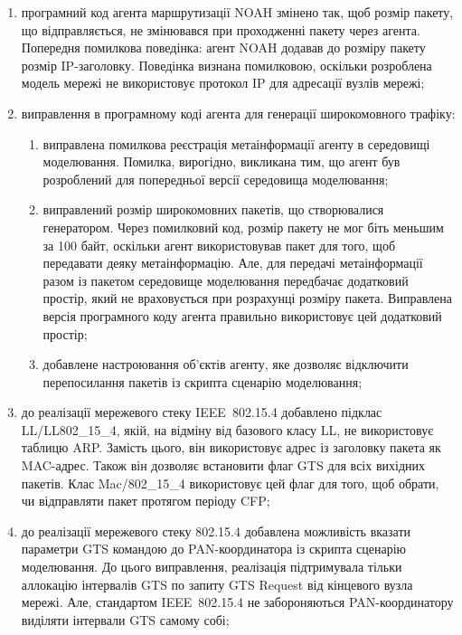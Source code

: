 \documentclass[a4paper,ukrainian,utf8,nocolumnsxix,floatsection,equationsection]{eskdtext}
\newcommand{\iee}[0]{IEEE~802.15.4\xspace}
\begin{document}
\begin{enumerate}

	\item програмний код агента маршрутизації NOAH змінено так, щоб розмір пакету, що відправляється, не змінювався при проходженні пакету через агента. Попередня помилкова поведінка: агент NOAH додавав до розміру пакету розмір IP-заголовку. Поведінка визнана помилковою, оскільки розроблена модель мережі не використовує протокол IP для адресації вузлів мережі; 

	\item виправлення в програмному коді агента для генерації широкомовного трафіку:
	\begin{enumerate}
		\item виправлена помилкова реєстрація метаінформації агенту в середовищі моделювання. Помилка, вирогідно, викликана тим, що агент був розроблений для попередньої версії середовища моделювання;
		
		\item виправлений розмір широкомовних пакетів, що створювалися генератором. Через помилковий код, розмір пакету не мог біть меньшим за 100 байт, оскільки агент використовував пакет для того, щоб передавати деяку метаінформацію. Але, для передачі метаінформації разом із пакетом середовище моделювання передбачає додатковий простір, який не враховується при розрахунці розміру пакета. Виправлена версія програмного коду агента правильно використовує цей додатковий простір;
		
		\item добавлене настроювання об’єктів агенту, яке дозволяє відключити перепосилання пакетів із скрипта сценарію моделювання;
	\end{enumerate}

	\item до реалізації мережевого стеку \iee добавлено підклас LL/LL802\_15\_4, якій, на відміну від базового класу LL, не використовує таблицю ARP. Замість цього, він використовує адрес із заголовку пакета як MAC-адрес. Також він дозволяє встановити флаг GTS для всіх вихідних пакетів. Клас Mac/802\_15\_4 використовує цей флаг для того, щоб обрати, чи відправляти пакет протягом періоду CFP; 

	\item до реалізації мережевого стеку 802.15.4 добавлена можливість вказати параметри GTS командою до PAN-координатора із скрипта сценарію моделювання. До цього виправлення, реалізація підтримувала тільки аллокацію інтервалів GTS по запиту GTS Request від кінцевого вузла мережі. Але, стандартом \iee не забороняються PAN-координатору виділяти інтервали GTS самому собі;



\end{enumerate}
\end{document}
